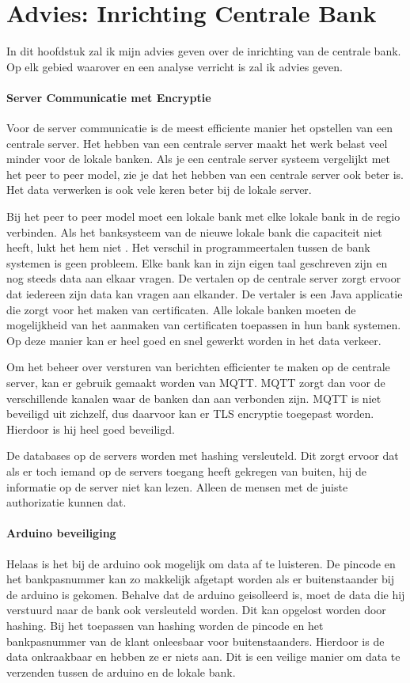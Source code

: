 \documentclass{article}
\begin{document}
\clearpage
\newpage

\section{Advies: Inrichting Centrale Bank}
In dit hoofdstuk zal ik mijn advies geven over de inrichting van de centrale bank.
Op elk gebied waarover en een analyse verricht is zal ik advies geven.

\paragraph{Server Communicatie met Encryptie}
Voor de server communicatie is de meest efficiente manier het opstellen
van een centrale server.
Het hebben van een centrale server maakt het werk belast veel minder
voor de lokale banken.
Als je een centrale server systeem vergelijkt met het peer to peer model,
zie je dat het hebben van een centrale server ook beter is.
Het data verwerken is ook vele keren beter bij de lokale server.

Bij het peer to peer model moet een lokale bank met elke lokale bank in de regio verbinden.
Als het banksysteem van de nieuwe lokale bank die capaciteit niet heeft,
lukt het hem niet
.
Het verschil in programmeertalen tussen de bank systemen is geen probleem.
Elke bank kan in zijn eigen taal geschreven zijn en nog steeds data aan elkaar vragen.
De vertalen op de centrale server zorgt ervoor dat iedereen zijn data kan vragen aan 
elkander.
De vertaler is een Java applicatie die zorgt voor het maken van certificaten.
Alle lokale banken moeten de mogelijkheid van het aanmaken van certificaten toepassen
in hun bank systemen.
Op deze manier kan er heel goed en snel gewerkt worden in het data verkeer.

Om het beheer over versturen van berichten efficienter te maken op de centrale server,
kan er gebruik gemaakt worden van MQTT.
MQTT zorgt dan voor de verschillende kanalen waar de banken dan aan verbonden zijn.
MQTT is niet beveiligd uit zichzelf,
dus daarvoor kan er TLS encryptie toegepast worden.
Hierdoor is hij heel goed beveiligd.

De databases op de servers worden met hashing versleuteld.
Dit zorgt ervoor dat als er toch iemand op de servers toegang heeft gekregen
van buiten, hij de informatie op de server niet kan lezen.
Alleen de mensen met de juiste authorizatie kunnen dat.

\paragraph{Arduino beveiliging}
Helaas is het bij de arduino ook mogelijk om data af te luisteren.
De pincode en het bankpasnummer kan zo makkelijk afgetapt worden
als er buitenstaander bij de arduino is gekomen.
Behalve dat de arduino geisolleerd is,
moet de data die hij verstuurd naar de bank ook versleuteld worden.
Dit kan opgelost worden door hashing.
Bij het toepassen van hashing worden de pincode en het bankpasnummer
van de klant onleesbaar voor buitenstaanders.
Hierdoor is de data onkraakbaar en hebben ze er niets aan.
Dit is een veilige manier om data te verzenden tussen
de arduino en de lokale bank.
\end{document}

